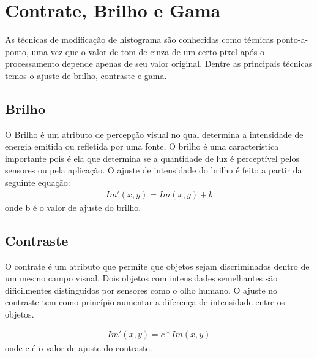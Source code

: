 \documentclass[
	article,			%
	11pt,				%
	oneside,			%
	a4paper,			%
	english,			%
	brazil,				%
	sumario=tradicional
	]{abntex2}
\begin{document}
\section{Contrate, Brilho e Gama}
As técnicas de modificação de histograma são conhecidas como técnicas ponto-a-ponto, uma
vez que o valor de tom de cinza de um certo pixel após o processamento depende apenas de seu
valor original. Dentre as principais técnicas temos o ajuste de brilho,
contraste e gama.

\subsection{Brilho}
O Brilho é um atributo de percepção visual no qual determina a intensidade de
energia emitida ou refletida por uma fonte, O brilho é uma característica
importante pois é ela que determina se a quantidade de luz é perceptível pelos
sensores ou pela aplicação. O ajuste de intensidade do brilho é feito a partir
da seguinte equação:
\begin{align}
Im'(x,y) = Im(x,y) + b
\end{align}
onde b é o valor de ajuste do brilho.


\subsection{Contraste}
O contrate é um atributo que permite que objetos sejam discriminados dentro de
um mesmo campo visual. Dois objetos com intensidades semelhantes são
dificilmentes distinguidos por sensores como o olho humano. O ajuste no
contraste tem como princípio aumentar a diferença de intensidade entre os
objetos.

\begin{align}
Im'(x,y) = c * Im(x,y)
\end{align}
onde c é o valor de ajuste do contraste.
\end{document}
